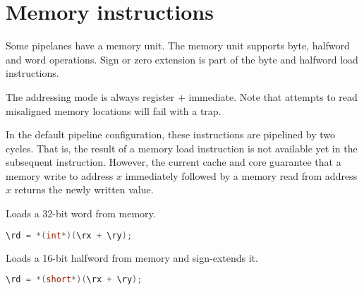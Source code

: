 
\section{Memory instructions}


Some \rvex{} pipelanes have a memory unit. The memory unit supports byte,
halfword and word operations. Sign or zero extension is part of the byte and
halfword load instructions.

The addressing mode is always register $+$ immediate. Note that attempts to read
misaligned memory locations will fail with a  trap.

In the default pipeline configuration, these instructions are pipelined by
two cycles. That is, the result of a memory load instruction is not available
yet in the subsequent instruction. However, the current cache and core guarantee
that a memory write to address $x$ immediately followed by a memory read from
address $x$ returns the newly written value.

Loads a 32-bit word from memory.

\begin{lstlisting}[numbers=none, basicstyle=\ttfamily\footnotesize, language=C++]
\rd = *(int*)(\rx + \ry);
\end{lstlisting}

Loads a 16-bit halfword from memory and sign-extends it.

\begin{lstlisting}[numbers=none, basicstyle=\ttfamily\footnotesize, language=C++]
\rd = *(short*)(\rx + \ry);
\end{lstlisting}

